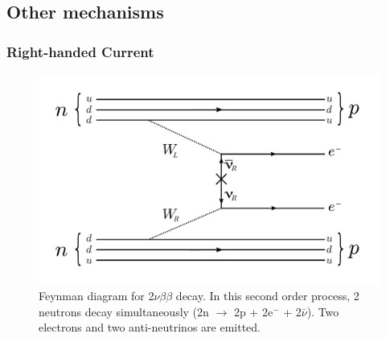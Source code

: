 \documentclass[main.tex]{subfiles}
\begin{document}
\FloatBarrier

\subsection{Other mechanisms}

\subsubsection{Right-handed Current}

\begin{figure}[h!]
\begin{center}
\includegraphics[scale=0.5]{pictures/Chap2/0nubbFeynmanDiagram_RHC.pdf}
\caption{Feynman diagram for 2$\nu\beta\beta$ decay. In this second order process, 2 neutrons decay simultaneously (2n $\rightarrow$ 2p + 2e$^-$ + 2$\bar{\nu}$). Two electrons and two anti-neutrinos are emitted.}
\label{OnbbFeynmanDiagramRHC}
\end{center}
\end{figure}
\end{document}

